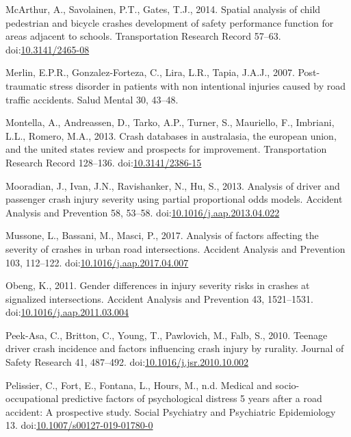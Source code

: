 \documentclass[]{elsarticle} %
\begin{document}
\leavevmode\hypertarget{ref-McArthur2014spatial}{}%
McArthur, A., Savolainen, P.T., Gates, T.J., 2014. Spatial analysis of
child pedestrian and bicycle crashes development of safety performance
function for areas adjacent to schools. Transportation Research Record
57--63. doi:\href{https://doi.org/10.3141/2465-08}{10.3141/2465-08}

\leavevmode\hypertarget{ref-Merlin2007stress}{}%
Merlin, E.P.R., Gonzalez-Forteza, C., Lira, L.R., Tapia, J.A.J., 2007.
Post-traumatic stress disorder in patients with non intentional injuries
caused by road traffic accidents. Salud Mental 30, 43--48.

\leavevmode\hypertarget{ref-Montella2013crash}{}%
Montella, A., Andreassen, D., Tarko, A.P., Turner, S., Mauriello, F.,
Imbriani, L.L., Romero, M.A., 2013. Crash databases in australasia, the
european union, and the united states review and prospects for
improvement. Transportation Research Record 128--136.
doi:\href{https://doi.org/10.3141/2386-15}{10.3141/2386-15}

\leavevmode\hypertarget{ref-Mooradian2013analysis}{}%
Mooradian, J., Ivan, J.N., Ravishanker, N., Hu, S., 2013. Analysis of
driver and passenger crash injury severity using partial proportional
odds models. Accident Analysis and Prevention 58, 53--58.
doi:\href{https://doi.org/10.1016/j.aap.2013.04.022}{10.1016/j.aap.2013.04.022}

\leavevmode\hypertarget{ref-Mussone2017analysis}{}%
Mussone, L., Bassani, M., Masci, P., 2017. Analysis of factors affecting
the severity of crashes in urban road intersections. Accident Analysis
and Prevention 103, 112--122.
doi:\href{https://doi.org/10.1016/j.aap.2017.04.007}{10.1016/j.aap.2017.04.007}

\leavevmode\hypertarget{ref-Obeng2011gender}{}%
Obeng, K., 2011. Gender differences in injury severity risks in crashes
at signalized intersections. Accident Analysis and Prevention 43,
1521--1531.
doi:\href{https://doi.org/10.1016/j.aap.2011.03.004}{10.1016/j.aap.2011.03.004}

\leavevmode\hypertarget{ref-Peek-Asa2010teenage}{}%
Peek-Asa, C., Britton, C., Young, T., Pawlovich, M., Falb, S., 2010.
Teenage driver crash incidence and factors influencing crash injury by
rurality. Journal of Safety Research 41, 487--492.
doi:\href{https://doi.org/10.1016/j.jsr.2010.10.002}{10.1016/j.jsr.2010.10.002}

\leavevmode\hypertarget{ref-Pelissier2019medical}{}%
Pelissier, C., Fort, E., Fontana, L., Hours, M., n.d. Medical and
socio-occupational predictive factors of psychological distress 5 years
after a road accident: A prospective study. Social Psychiatry and
Psychiatric Epidemiology 13.
doi:\href{https://doi.org/10.1007/s00127-019-01780-0}{10.1007/s00127-019-01780-0}
\end{document}
